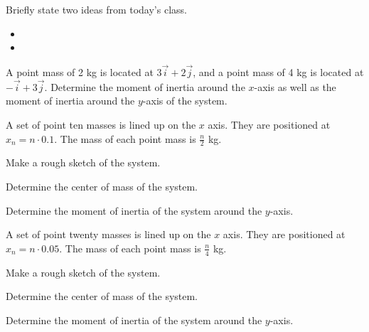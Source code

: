 \postClass

\begin{problem}
\item Briefly state two ideas from today's class.
  \begin{itemize}
  \item 
  \item 
  \end{itemize}
\item 
  \begin{subproblem}
    \item
  \end{subproblem}
\end{problem}


\begin{problem}
\item A point mass of 2 kg is located at $3\vec{i} + 2\vec{j}$, and a
  point mass of 4 kg is located at $-\vec{i}+3\vec{j}$. Determine the
  moment of inertia around the $x$-axis as well as the moment of
  inertia around the $y$-axis  of the system.

  \vfill

\end{problem}


\begin{problem}
\item A set of point ten masses is lined up on the $x$ axis. They are
  positioned at $x_n=n\cdot 0.1$. The mass of each point mass is
  $\frac{n}{2}$ kg.
  \begin{subproblem}
    \item Make a rough sketch of the system.
      \vfill
    \item Determine the center of mass of the system.
      \vfill
    \item Determine the moment of inertia of the system around the
      $y$-axis.
      \vfill
  \end{subproblem}

  \clearpage

\item A set of point twenty masses is lined up on the $x$ axis. They are
  positioned at $x_n=n\cdot 0.05$. The mass of each point mass is
  $\frac{n}{4}$ kg.
  \begin{subproblem}
    \item Make a rough sketch of the system.
      \vfill
    \item Determine the center of mass of the system.
      \vfill
    \item Determine the moment of inertia of the system around the
      $y$-axis.
      \vfill
  \end{subproblem}

\end{problem}

